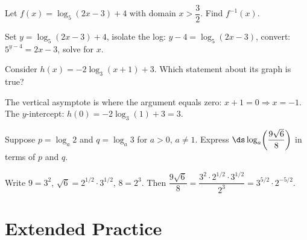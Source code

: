 \documentclass{ximera}
\begin{document}
\begin{problem}
Let $f(x)=\log_{5}(2x-3)+4$ with domain $x>\dfrac{3}{2}$. Find $f^{-1}(x)$.
\begin{hint}
Set $y = \log_5(2x-3)+4$, isolate the log: $y-4=\log_5(2x-3)$, convert: $5^{y-4}=2x-3$, solve for $x$.
\end{hint}
\begin{multipleChoice}
\end{multipleChoice}
\end{problem}

\begin{problem}
Consider $h(x)=-2\log_{3}(x+1)+3$. Which statement about its graph is true?
\begin{hint}
The vertical asymptote is where the argument equals zero: $x+1=0 \Rightarrow x=-1$. The $y$-intercept: $h(0)=-2\log_3(1)+3=3$.
\end{hint}
\begin{multipleChoice}
\end{multipleChoice}
\end{problem}

\begin{problem}
Suppose $p=\log_{a} 2$ and $q=\log_{a} 3$ for $a>0$, $a\neq1$. Express $\ds\log_{a}\!\left(\dfrac{9\sqrt{6}}{8}\right)$ in terms of $p$ and $q$.
\begin{hint}
Write $9=3^2$, $\sqrt{6}=2^{1/2}\cdot3^{1/2}$, $8=2^3$. Then $\dfrac{9\sqrt{6}}{8} = \dfrac{3^2\cdot 2^{1/2}\cdot 3^{1/2}}{2^3} = 3^{5/2}\cdot 2^{-5/2}$.
\end{hint}
\begin{multipleChoice}
\end{multipleChoice}
\end{problem}


\bigskip
\section*{Extended Practice}
\end{document}
